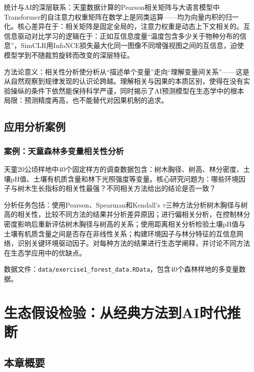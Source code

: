 \documentclass[
  twoside,12pt,fontset=none]{ctexbook}
\begin{document}
统计与AI的深层联系：天童数据计算的Pearson相关矩阵与大语言模型中Transformer的自注意力权重矩阵在数学上是同类运算------均为向量内积的归一化。核心差异在于：相关矩阵是固定全局的，注意力权重是动态上下文相关的。互信息驱动对比学习的逻辑在于：正如互信息度量``温度包含多少关于物种分布的信息''，SimCLR用InfoNCE损失最大化同一图像不同增强视图之间的互信息，迫使模型学到不随裁剪旋转而改变的深层特征。

方法论意义：相关性分析使分析从``描述单个变量''走向``理解变量间关系''------这是从自然观察到规律发现的认识论跨越。理解相关与因果的本质区别，使得在没有实验操纵的条件下依然能保持科学严谨，同时揭示了AI预测模型在生态学中的根本局限：预测精度再高，也不能替代对因果机制的追求。

\hypertarget{ux5e94ux7528ux5206ux6790ux6848ux4f8b-3}{%
\section{应用分析案例}\label{ux5e94ux7528ux5206ux6790ux6848ux4f8b-3}}

\hypertarget{ux6848ux4f8bux5929ux7ae5ux68eeux6797ux591aux53d8ux91cfux76f8ux5173ux6027ux5206ux6790}{%
\subsection{案例：天童森林多变量相关性分析}\label{ux6848ux4f8bux5929ux7ae5ux68eeux6797ux591aux53d8ux91cfux76f8ux5173ux6027ux5206ux6790}}

天童20公顷样地中40个固定样方的调查数据包含：树木胸径、树高、林分密度、土壤pH值、土壤有机质含量和林下光照强度等变量。核心研究问题为：哪些环境因子与树木生长指标的相关性最强？不同相关方法给出的结论是否一致？

分析任务包括：使用Pearson、Spearman和Kendall's \(\tau\)三种方法分析树木胸径与树高的相关性，比较不同方法的结果并分析差异原因；进行偏相关分析，在控制林分密度影响后重新评估树木胸径与树高的关系；使用距离相关分析检验土壤pH值与土壤有机质含量之间是否存在非线性关系；构建环境因子与林分特征的互信息网络，识别关键环境驱动因子。对每种方法的结果进行生态学阐释，并讨论不同方法在生态学应用中的优缺点。

数据文件：\texttt{data/exercise1\_forest\_data.RData}，包含40个森林样地的多变量数据。

\hypertarget{ch06}{%
\chapter{生态假设检验：从经典方法到AI时代推断}\label{ch06}}

\hypertarget{ux672cux7ae0ux6982ux8981-4}{%
\section{本章概要}\label{ux672cux7ae0ux6982ux8981-4}}
\end{document}
